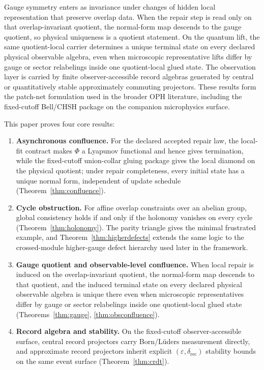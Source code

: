 \documentclass[11pt]{article}
\theoremstyle{remark}
\theoremstyle{plain}
\begin{document}
Gauge symmetry enters as invariance under changes of hidden local representation that preserve
overlap data. When the repair step is read only on that overlap-invariant quotient, the
normal-form map descends to the gauge quotient, so physical uniqueness is a quotient statement.
On the quantum lift, the same quotient-local carrier determines a unique terminal state on every
declared physical observable algebra, even when microscopic representative lifts differ by gauge
or sector relabelings inside one quotient-local glued state.
The observation layer is carried by finite observer-accessible record algebras generated by
central or quantitatively stable approximately commuting projectors. These results form the
patch-net formulation used in the broader OPH literature, including the fixed-cutoff Bell/CHSH
package on the companion microphysics surface.

This paper proves four core results:

\begin{enumerate}
\item \textbf{Asynchronous confluence.} For the declared accepted repair law, the local-fit contract makes \(\Phi\) a Lyapunov functional and hence gives termination, while the fixed-cutoff union-collar gluing package gives the local diamond on the physical quotient; under repair completeness, every initial state has a unique normal form, independent of update schedule (Theorem~\ref{thm:confluence}).
\item \textbf{Cycle obstruction.} For affine overlap constraints over an abelian group, global consistency holds if and only if the holonomy vanishes on every cycle (Theorem~\ref{thm:holonomy}). The parity triangle gives the minimal frustrated example, and Theorem~\ref{thm:higherdefects} extends the same logic to the crossed-module higher-gauge defect hierarchy used later in the framework.
\item \textbf{Gauge quotient and observable-level confluence.} When local repair is induced on the overlap-invariant quotient, the normal-form map descends to that quotient, and the induced terminal state on every declared physical observable algebra is unique there even when microscopic representatives differ by gauge or sector relabelings inside one quotient-local glued state (Theorems~\ref{thm:gauge}, \ref{thm:obsconfluence}).
\item \textbf{Record algebra and stability.} On the fixed-cutoff observer-accessible surface, central record projectors carry Born/L\"uders measurement directly, and approximate record projectors inherit explicit \((\varepsilon,\delta_{\mathrm{rec}})\) stability bounds on the same event surface (Theorem~\ref{thm:crdt}).
\end{enumerate}
\end{document}
